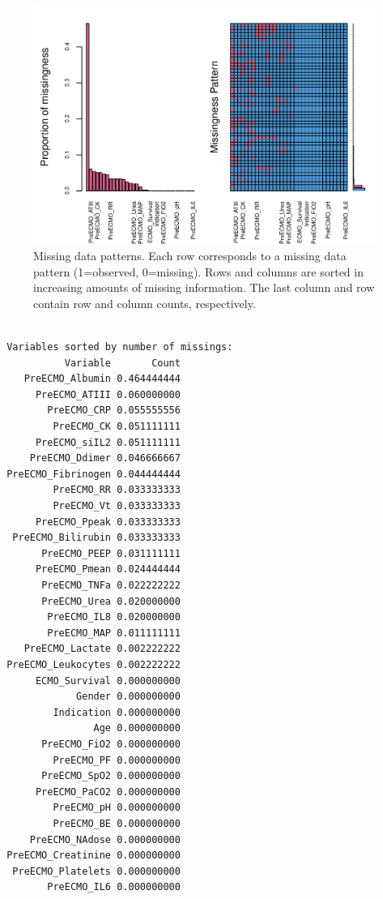 \documentclass[12pt,]{article}
\begin{document}
\begin{figure}[H]

{\centering \includegraphics[width=1\linewidth]{figure/graphics-unnamed-chunk-17-1} 

}

\caption{\label{fig:missing-data-patterns}Missing data patterns.  Each row corresponds to a missing data pattern (1=observed, 0=missing).  Rows and columns are sorted in increasing amounts of missing information.  The last column and row contain row and column counts, respectively.}\label{fig:unnamed-chunk-17}
\end{figure}

\begin{verbatim}

 Variables sorted by number of missings: 
           Variable       Count
    PreECMO_Albumin 0.464444444
      PreECMO_ATIII 0.060000000
        PreECMO_CRP 0.055555556
         PreECMO_CK 0.051111111
      PreECMO_siIL2 0.051111111
     PreECMO_Ddimer 0.046666667
 PreECMO_Fibrinogen 0.044444444
         PreECMO_RR 0.033333333
         PreECMO_Vt 0.033333333
      PreECMO_Ppeak 0.033333333
  PreECMO_Bilirubin 0.033333333
       PreECMO_PEEP 0.031111111
      PreECMO_Pmean 0.024444444
       PreECMO_TNFa 0.022222222
       PreECMO_Urea 0.020000000
        PreECMO_IL8 0.020000000
        PreECMO_MAP 0.011111111
    PreECMO_Lactate 0.002222222
 PreECMO_Leukocytes 0.002222222
      ECMO_Survival 0.000000000
             Gender 0.000000000
         Indication 0.000000000
                Age 0.000000000
       PreECMO_FiO2 0.000000000
         PreECMO_PF 0.000000000
       PreECMO_SpO2 0.000000000
      PreECMO_PaCO2 0.000000000
         PreECMO_pH 0.000000000
         PreECMO_BE 0.000000000
     PreECMO_NAdose 0.000000000
 PreECMO_Creatinine 0.000000000
  PreECMO_Platelets 0.000000000
        PreECMO_IL6 0.000000000
\end{verbatim}
\end{document}
